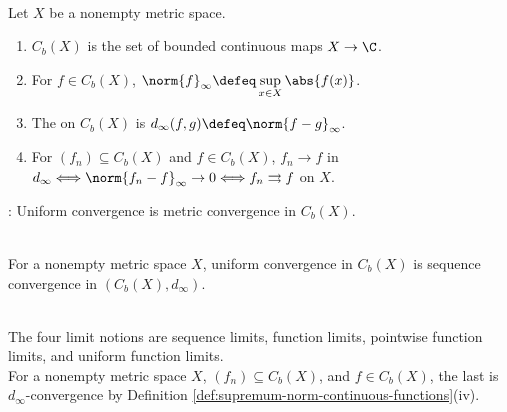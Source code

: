 \begin{definition} \label{def:supremum-norm-continuous-functions} \\
Let $X$ be a nonempty metric space.
\begin{enumerate}[label=(\roman*)]
\setlength{\itemsep}{0pt}
\item $C_b(X)$ is the set of bounded continuous maps $X\to\C$.
\item For $f\in C_b(X)$, $\norm{f}_{\infty}\defeq\sup\limits_{x\in X}\abs{f(x)}$.
\item The  on $C_b(X)$ is $d_{\infty}(f,g)\defeq\norm{f-g}_{\infty}$.
\item For $(f_n)\subseteq C_b(X)$ and $f\in C_b(X)$, $f_n\to f$ in $d_{\infty}\Longleftrightarrow\norm{f_n-f}_{\infty}\to0\Longleftrightarrow f_n\rightrightarrows f$ on $X$.
\end{enumerate}
: Uniform convergence is metric convergence in $C_b(X)$.
\end{definition}

\begin{perspective} \label{per:supremum-metric-function-space-lens} \\
For a nonempty metric space $X$, uniform convergence in $C_b(X)$ is sequence convergence in $(C_b(X),d_{\infty})$.
\end{perspective}

\begin{perspective} \label{per:four-limit-notions-function-space-view} \\
The four limit notions are sequence limits, function limits, pointwise function limits, and uniform function limits.\\
For a nonempty metric space $X$, $(f_n)\subseteq C_b(X)$, and $f\in C_b(X)$, the last is $d_{\infty}$-convergence by Definition \ref{def:supremum-norm-continuous-functions}(iv).
\end{perspective}
